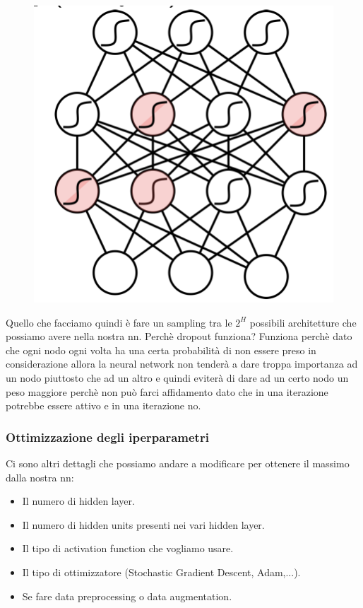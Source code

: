 \documentclass[14pt]{extreport}
\begin{document}
\begin{itemize}
\begin{figure}[H]
		      \includegraphics[width=0.7\linewidth]{428.jpeg}
	      \end{figure}
	      Quello che facciamo quindi è fare un sampling tra le $2^H$ possibili architetture che possiamo avere nella nostra nn. Perchè dropout
	      funziona? Funziona perchè dato che ogni nodo ogni volta ha una certa probabilità di non essere preso in considerazione allora la neural
	      network non tenderà a dare troppa importanza ad un nodo piuttosto che ad un altro e quindi eviterà di dare ad un certo nodo un peso maggiore
	      perchè non può farci affidamento dato che in una iterazione potrebbe essere attivo e in una iterazione no.
\end{itemize}

\subsubsection{Ottimizzazione degli iperparametri}

Ci sono altri dettagli che possiamo andare a modificare per ottenere il massimo dalla nostra nn:
\begin{itemize}
	\item Il numero di hidden layer.
	\item Il numero di hidden units presenti nei vari hidden layer.
	\item Il tipo di activation function che vogliamo usare.
	\item Il tipo di ottimizzatore (Stochastic Gradient Descent, Adam,...).
	\item Se fare data preprocessing o data augmentation.
\end{itemize}
\end{document}
